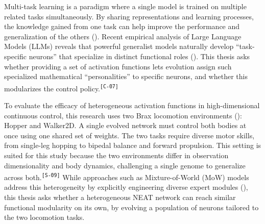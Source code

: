 \documentclass[12pt]{article}
\newcommand{\revID}[1]{\textsuperscript{\scriptsize\texttt{[#1]}}}
\newcommand{\revWeak}[2]{\textcolor{revOrange}{#2}\revID{#1}}
\newcommand{\revStyle}[2]{\textcolor{revViolet}{#2}\revID{#1}}
\begin{document}

Multi-task learning is a paradigm where a single model is trained on multiple related tasks simultaneously.
By sharing representations and learning processes, the knowledge gained from one task can help improve the performance and generalization of the others (\cite{zhang_survey_2021}).
Recent empirical analysis of Large Language Models (LLMs) reveals that powerful generalist models naturally develop ``task-specific neurons'' that specialize in distinct functional roles (\cite{leng_understanding_2025}).
\revWeak{C-07}{This thesis asks whether providing a set of activation functions lets evolution assign such specialized mathematical ``personalities'' to specific neurons, and whether this modularizes the control policy.}

To evaluate the efficacy of heterogeneous activation functions in high-dimensional continuous control, this research uses two Brax locomotion environments (\cite{freeman_brax_2021}): Hopper and Walker2D.
A single evolved network must control both bodies at once using one shared set of weights.
The two tasks require diverse motor skills, from single-leg hopping to bipedal balance and forward propulsion.
\revStyle{S-09}{This setting is suited for this study because the two environments differ in observation dimensionality and body dynamics, challenging a single genome to generalize across both.}
While approaches such as Mixture-of-World (MoW) models address this heterogeneity by explicitly engineering diverse expert modules (\cite{zhang_mixtureofworld_2026}), this thesis asks whether a heterogeneous NEAT network can reach similar functional modularity on its own, by evolving a population of neurons tailored to the two locomotion tasks.


\end{document}
